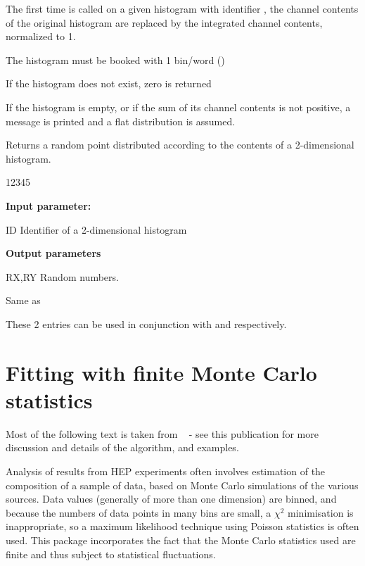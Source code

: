 \Remark
\begin{UL}
\item The first time  is called on a given histogram with identifier
, the channel contents of the original histogram are
replaced by the integrated channel contents, normalized to 1.
\item The histogram  must be booked with 1 bin/word ()
\item If the histogram  does not exist, zero is returned
\item If the histogram  is empty, or if the sum of
its channel contents is not positive, a message is printed
and a flat distribution is assumed.
\end{UL}
 
 
\Action
Returns a random point  distributed according to the
contents of a 2-dimensional histogram.
 
\begin{DLtt}{12345}
\item[{\rm\bf Input parameter:}]
\item[ID] Identifier of a 2-dimensional histogram
\item[{\rm\bf Output parameters}]
\item[RX,RY] Random numbers.
\end{DLtt}
 
\Remark
\begin{UL}
\item Same as 
\item These 2 entries can be used in conjunction with  and
 respectively.
\end{UL}
 
\section{Fitting with finite Monte Carlo statistics}
 
Most of the following text is taken from ~\cite{bib-FINITEMC} - see this
publication for more discussion and details of the algorithm, and examples.
 
Analysis of results from HEP experiments often involves
estimation of the composition of a sample of data,
based on Monte Carlo simulations of the various sources.
Data values (generally of more than one dimension) are binned, and
because the numbers of data points in many bins are small, a $\chi^2$
minimisation is inappropriate, so a maximum likelihood technique using
Poisson statistics is often used.    This package incorporates
the fact that the Monte Carlo statistics used are finite and thus
subject to statistical fluctuations.
 
